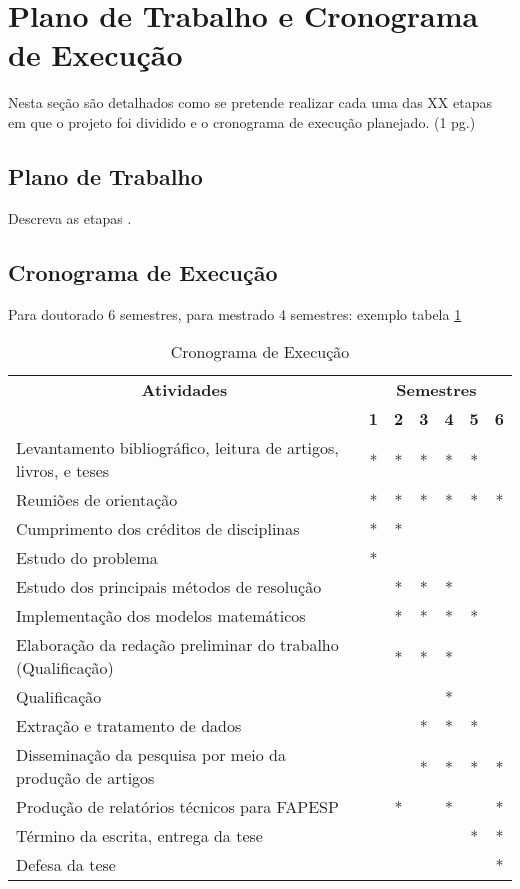 
\section{Plano de Trabalho e Cronograma de Execução}

Nesta seção são detalhados como se pretende realizar cada uma das XX etapas em que o projeto foi dividido e o cronograma de execução planejado. (1 pg.)

\subsection{Plano de Trabalho}

Descreva as etapas .


\subsection{Cronograma de Execução}
Para doutorado 6 semestres, para mestrado 4 semestres: exemplo tabela \ref{tab:1}

\begin{table}[htbp] \centering
	\caption{Cronograma de Execução}
	\label{tab:1}
	\begin{tabular}{l|c|c|c|c|c|c}
		\hline
		\multicolumn{ 1}{c|}{\textbf{Atividades}} & \multicolumn{ 6}{c}{\textbf{Semestres}} \\ 
		\cline{ 2- 7}
		\multicolumn{ 1}{l|}{} & \textbf{1} & \textbf{2} & \textbf{3} & \textbf{4} & \textbf{5} & \textbf{6} \\ \hline
		Levantamento bibliográfico, leitura de artigos, livros, e teses & * & * & * & * & * &  \\ \hline
		Reuniões de orientação & * & * & * & * & * & * \\ \hline
		Cumprimento dos créditos de disciplinas & * & *  &  &  &  &  \\ \hline
		Estudo do problema & * &  &  &  &  &  \\ \hline
		Estudo dos principais métodos de resolução &  & * & * & * &  &  \\ \hline
		Implementação dos modelos matemáticos &  & * & * & * &* &  \\ \hline
		Elaboração da redação preliminar do trabalho (Qualificação) &  & * & * & * &  &  \\ \hline
		Qualificação &  &  &  & * &  &  \\ \hline
		Extração e tratamento de dados &  &  & * & * & * &  \\ \hline
		Disseminação da pesquisa por meio da produção de artigos &  &  & * & * & * & * \\ \hline
		Produção de relatórios técnicos para FAPESP &  & * &  & * &  & * \\ \hline
		Término da escrita, entrega da tese &  &  &  &  & * & * \\ \hline
		Defesa da tese &  &  &  &  &  & * \\ \hline
	\end{tabular}
\end{table}
